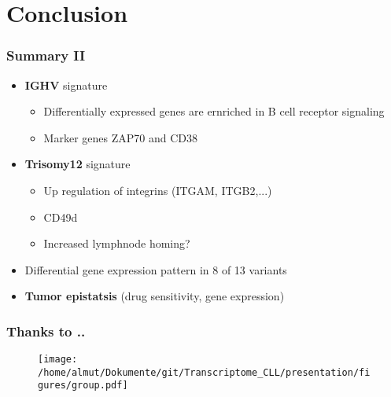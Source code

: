 \documentclass[xcolor=dvipsnames,t,10pt]{beamer}
\begin{document}
\section{Conclusion}
%
%
\begin{frame}[c]
	\frametitle{Summary II}
	\begin{itemize}
		\item \textbf{IGHV} signature
		\begin{itemize}
			\item Differentially expressed genes are ernriched in B cell receptor signaling
			\item Marker genes ZAP70 and CD38 
		\end{itemize}
		\item \textbf{Trisomy12} signature
		\begin{itemize}
			\item Up regulation of integrins (ITGAM, ITGB2,...)
			\item CD49d
			\item Increased lymphnode homing?
		\end{itemize} 
		\item Differential gene expression pattern in 8 of 13 variants
		\item \textbf{Tumor epistatsis} (drug sensitivity, gene expression)
	\end{itemize}
\end{frame}
% 
% 
%
\begin{frame}[c]
	\frametitle{Thanks to ..}
	\begin{figure}
		\centering
		\texttt{[image: /home/almut/Dokumente/git/Transcriptome\_CLL/presentation/figures/group.pdf]}
	\end{figure}
\end{frame}
% 
% 
% 
\appendix
\end{document}
